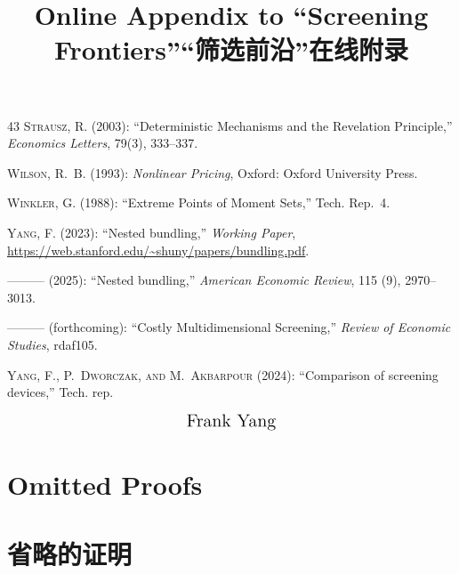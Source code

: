 \documentclass[12pt,letterpaper]{article}
\newenvironment{original}{\color{black}\noindent}{}
\newenvironment{translation}{\color{blue}\noindent}{}
\theoremstyle{plain}
\theoremstyle{definition}
\theoremstyle{remark}
\renewcommand{\1}{\mathds{1}}
\theoremstyle{definition}
\begin{document}
\begin{thebibliography}{43}
\textsc{Strausz, R.} (2003): \enquote{Deterministic Mechanisms and the Revelation Principle,} \emph{Economics Letters}, 79(3), 333--337.

\textsc{Wilson, R.~B.} (1993): \emph{Nonlinear Pricing}, Oxford: Oxford University Press.

\textsc{Winkler, G.} (1988): \enquote{{Extreme Points of Moment Sets},} Tech. Rep.~4.

\textsc{Yang, F.} (2023): \enquote{Nested bundling,} \emph{Working Paper}, \url{https://web.stanford.edu/~shuny/papers/bundling.pdf}.

---\hspace{-.1pt}---\hspace{-.1pt}--- (2025): \enquote{Nested bundling,} \emph{American Economic Review}, 115 (9), 2970--3013.

---\hspace{-.1pt}---\hspace{-.1pt}--- (forthcoming): \enquote{Costly Multidimensional Screening,} \emph{Review of Economic Studies}, rdaf105.

\textsc{Yang, F., P.~Dworczak, and M.~Akbarpour} (2024): \enquote{Comparison of screening devices,} Tech. rep.

\end{thebibliography}

\newpage
\appendix
{}

\begin{original}
\noindent\title{\qquad \qquad \centering \LARGE \textbf{Online Appendix to ``Screening Frontiers''}}
\end{original}
\begin{translation}
\noindent\title{\qquad \qquad \centering \LARGE \textbf{``筛选前沿''在线附录}}
\end{translation}

\[\text{\centering \Large Frank Yang}\]

\begin{original}
\section{Omitted Proofs}\label{app:proof}
\end{original}
\begin{translation}
\section{省略的证明}\label{app:proof}
\end{translation}
\end{document}
